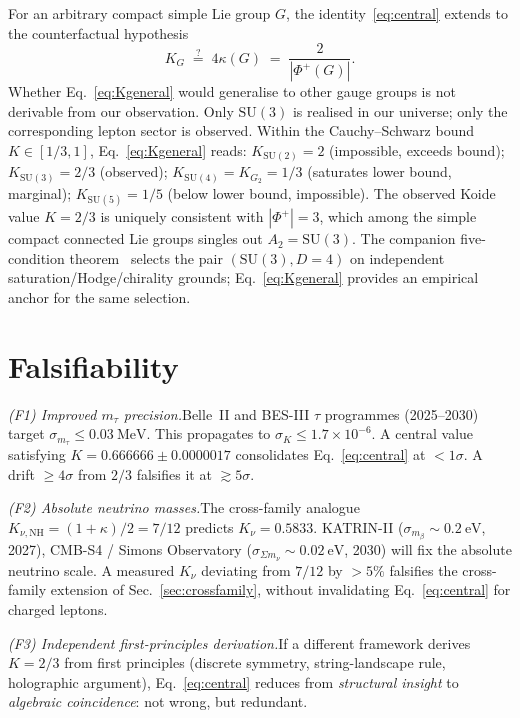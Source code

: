 \documentclass[aps,prl,reprint,amsmath,amssymb,nofootinbib,floatfix,superscriptaddress]{revtex4-2}
\newcommand{\SU}{\mathrm{SU}}
\newcommand{\Phiroots}{\Phi^{+}}
\begin{document}
For an arbitrary compact simple Lie group $G$, the identity~\eqref{eq:central} extends to the counterfactual hypothesis
\begin{equation}
K_G \;\stackrel{?}{=}\; 4 \kappa(G) \;=\; \frac{2}{|\Phiroots(G)|}.
\label{eq:Kgeneral}
\end{equation}
Whether Eq.~\eqref{eq:Kgeneral} would generalise to other gauge groups is not derivable from our observation. Only $\SU(3)$ is realised in our universe; only the corresponding lepton sector is observed. Within the Cauchy--Schwarz bound $K \in [1/3, 1]$, Eq.~\eqref{eq:Kgeneral} reads:
$K_{\SU(2)} = 2$ (impossible, exceeds bound);
$K_{\SU(3)} = 2/3$ (observed);
$K_{\SU(4)} = K_{G_2} = 1/3$ (saturates lower bound, marginal);
$K_{\SU(5)} = 1/5$ (below lower bound, impossible).
The observed Koide value $K = 2/3$ is uniquely consistent with $|\Phiroots| = 3$, which among the simple compact connected Lie groups singles out $A_2 = \SU(3)$. The companion five-condition theorem~\cite{Remondiere2026a} selects the pair $(\SU(3), D{=}4)$ on independent saturation/Hodge/chirality grounds; Eq.~\eqref{eq:Kgeneral} provides an empirical anchor for the same selection.

\section{Falsifiability}
\label{sec:falsifiability}

\textit{(F1) Improved $m_\tau$ precision.}\quad Belle~II and BES-III $\tau$ programmes (2025--2030) target $\sigma_{m_\tau} \le 0.03~\mathrm{MeV}$. This propagates to $\sigma_K \le 1.7 \times 10^{-6}$. A central value satisfying $K = 0.666666 \pm 0.0000017$ consolidates Eq.~\eqref{eq:central} at $<1\sigma$. A drift $\ge 4\sigma$ from $2/3$ falsifies it at $\gtrsim 5\sigma$.

\textit{(F2) Absolute neutrino masses.}\quad The cross-family analogue $K_{\nu, \mathrm{NH}} = (1 + \kappa)/2 = 7/12$ predicts $K_\nu = 0.5833$. KATRIN-II ($\sigma_{m_\beta} \sim 0.2~\mathrm{eV}$, 2027), CMB-S4 / Simons Observatory ($\sigma_{\Sigma m_\nu} \sim 0.02~\mathrm{eV}$, 2030) will fix the absolute neutrino scale. A measured $K_\nu$ deviating from $7/12$ by $> 5\%$ falsifies the cross-family extension of Sec.~\ref{sec:crossfamily}, without invalidating Eq.~\eqref{eq:central} for charged leptons.

\textit{(F3) Independent first-principles derivation.}\quad If a different framework derives $K = 2/3$ from first principles (discrete symmetry, string-landscape rule, holographic argument), Eq.~\eqref{eq:central} reduces from \emph{structural insight} to \emph{algebraic coincidence}: not wrong, but redundant.
\end{document}
